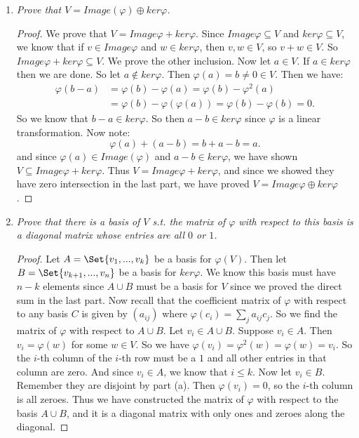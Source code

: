 \documentclass[9pt,reqno,twoside]{amsbook}
\theoremstyle{plain}
\numberwithin{section}{chapter}
\numberwithin{equation}{chapter}
\theoremstyle{definition}
\theoremstyle{remark}
\theoremstyle{plain}
\newcommand{\sub}{\subseteq}
\newcommand{\bee}{\begin{equation}\begin{aligned}}
\newcommand{\eee}{\end{aligned}\end{equation}}
\renewcommand{\leq}{\leqslant}
\renewcommand{\phi}{\varphi}
\begin{document}
\begin{enumerate}[label=\arabic*.]
\begin{enumerate}
\item \textit{Prove that $V = Image(\phi)\oplus ker\phi$. }

\begin{proof}
We prove that $V = Image\phi + ker\phi$. Since $Image\phi \sub V$ and $ker\phi \sub V$, we know that if $v \in Image\phi$ and $w \in ker\phi$, then $v,w \in V$, so $v + w \in V$. So $Image\phi + ker\phi \sub V$. We prove the other inclusion. Now let $a \in V$. If $a \in ker\phi$ then we are done. So let $a \notin ker\phi$. Then $\phi(a) = b \neq 0 \in V$. Then we have: 
\bee
\phi(b - a) &= \phi(b) - \phi(a) = \phi(b) - \phi^2(a)\\
 &= \phi(b) - \phi(\phi(a)) = \phi(b) - \phi(b) = 0.
\eee
So we know that $b - a \in ker\phi$. So then $a - b \in ker\phi$ since $\phi$ is a linear transformation. Now note: 
$$
\phi(a) + (a - b) = b + a - b = a.
$$
and since $\phi(a) \in Image(\phi)$ and $a - b \in ker\phi$, we have shown $V \sub Image\phi + ker\phi$. Thus $V = Image\phi + ker\phi$, and since we showed they have zero intersection in the last part, we have proved $V = Image\phi \oplus ker\phi$. 
\end{proof}



\item \textit{Prove that there is a basis of $V$ s.t. the matrix of $\phi$ with respect to this basis is a diagonal matrix whose entries are all $0$ or $1$. }

\begin{proof}
Let $A = \Set{v_1,...,v_k}$ be a basis for $\phi(V)$. Then let $B = \Set{v_{k + 1},...,v_n}$ be a basis for $ker\phi$. We know this basis must have $n - k$ elements since $A \cup B$ must be a basis for $V$ since we proved the direct sum in the last part. Now recall that the coefficient matrix of $\phi$ with respect to any basis $C$ is given by $(a_{ij})$ where $\phi(c_i) = \sum_j a_{ij}c_j$. So we find the matrix of $\phi$ with respect to $A \cup B$. Let $v_i \in A \cup B$. Suppose $v_i \in A$. Then $v_i = \phi(w)$ for some $w \in V$. So we have $\phi(v_i) = \phi^2(w) = \phi(w) = v_i$. So the $i$-th column of the $i$-th row must be a $1$ and all other entries in that column are zero. And since $v_i \in A$, we know that $i \leq k$. Now let $v_i \in B$. Remember they are disjoint by part (a). Then $\phi(v_i) = 0$, so the $i$-th column is all zeroes. Thus we have constructed the matrix of $\phi$ with respect to the basis $A \cup B$, and it is a diagonal matrix with only ones and zeroes along the diagonal.  
\end{proof}
\end{enumerate}

\end{enumerate}
\end{document}

